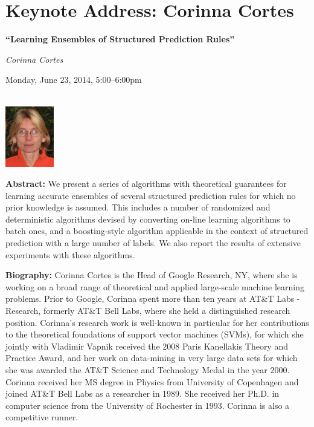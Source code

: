 \section{Keynote Address: Corinna Cortes}
\begin{center}

\begin{Large}
{\bfseries\Large ``Learning Ensembles of Structured Prediction Rules''}\vspace{1em}\par
\end{Large}

{\itshape Corinna Cortes}\vspace{1em}\par
Monday, June 23, 2014, 5:00--6:00pm \vspace{1em}\\
\PlenaryLoc \\
\vspace{1em}\par
\includegraphics[height=100px]{content/monday/cortes-headshot.png}
\end{center}

\noindent
{\bfseries Abstract:} We present a series of algorithms with
theoretical guarantees for learning accurate ensembles of several
structured prediction rules for which no prior knowledge is assumed.
This includes a number of randomized and deterministic algorithms
devised by converting on-line learning algorithms to batch ones, and a
boosting-style algorithm applicable in the context of structured
prediction with a large number of labels. We also report the results
of extensive experiments with these algorithms.

\vspace{3em}\par 

\vfill
\noindent

{\bfseries Biography:} Corinna Cortes is the Head of Google Research,
NY, where she is working on a broad range of theoretical and applied
large-scale machine learning problems. Prior to Google, Corinna spent
more than ten years at AT\&T Labs - Research, formerly AT\&T Bell Labs,
where she held a distinguished research position. Corinna's research
work is well-known in particular for her contributions to the
theoretical foundations of support vector machines (SVMs), for which
she jointly with Vladimir Vapnik received the 2008 Paris Kanellakis
Theory and Practice Award, and her work on data-mining in very large
data sets for which she was awarded the AT\&T Science and Technology
Medal in the year 2000. Corinna received her MS degree in Physics from
University of Copenhagen and joined AT\&T Bell Labs as a researcher in
1989. She received her Ph.D. in computer science from the University
of Rochester in 1993. Corinna is also a competitive runner.

\newpage

